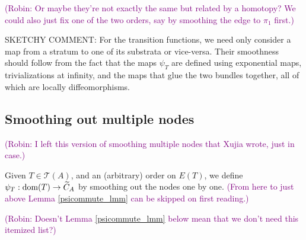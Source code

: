\documentclass[11pt]{article}
\theoremstyle{definition}
\theoremstyle{remark}
\def\wt#1{\widetilde{#1}}
\def\cT{\mathcal{T}}
\def\cmt#1{\textcolor{purple}{(#1)}}
\def\tn#1{\textnormal{#1}}
\begin{document}
\cmt{Robin: Or maybe they're not exactly the same but related by a homotopy?  We could also just fix one of the two orders, say by smoothing the edge to $\pi_1$ first.}

SKETCHY COMMENT:  For the transition functions, we need only consider a map from a stratum to one of its substrata or vice-versa.  Their smoothness should follow from the fact that the maps $\psi_T$ are defined using exponential maps, trivializations at infinity, and the maps that glue the two bundles together, all of which are locally diffeomorphisms. 


\subsection{Smoothing out multiple nodes}

\cmt{Robin: I left this version of smoothing multiple nodes that Xujia wrote, just in case.} 

Given $T\in\cT(A)$, and an (arbitrary) order on $E(T)$, 
we define $\psi_T:\tn{dom}(T)\to\wt{C}_A$  by smoothing out the nodes one by one. 
\cmt{From here to just above Lemma \ref{psicommute_lmm} can be skipped on first reading.}

\cmt{Robin: Doesn't Lemma \ref{psicommute_lmm} below mean that we don't need this itemized list?}
\end{document}
